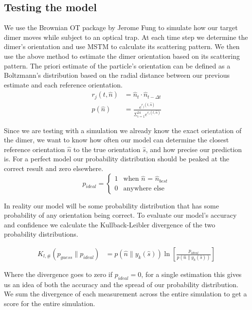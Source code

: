 \documentclass[11pt]{article}
\begin{document}
	\subsection*{Testing the model}
	We use the Brownian OT package by Jerome Fung \cite{Brownian_OT} to simulate how our target dimer moves while subject to an optical trap. At each time step we determine the dimer's orientation and use MSTM to calculate its scattering pattern. We then use the above method to estimate the dimer orientation based on its scattering pattern. The priori estimate of the particle's orientation can be defined as a Boltzmann's distribution based on the radial distance between our previous estimate and each reference orientation. 
	\begin{align}
		r_j(t, \hat{n})&= \hat{n}_{t} \cdot \hat{n}_{t-\Delta t} \\
		p(\hat{n})&= \frac{e^{r_j(t,\hat{n})}}
		{\Sigma_{i=1}^{24}e^{r_i(t, \hat{n})}}
	\end{align}
	
	Since we are testing with a simulation we already know the exact orientation of the dimer, we want to know how often our model can determine the closest reference orientation $\hat{n}$ to the true orientation $\hat{s}$, and how precise our prediction is. For a perfect model our probability distribution should be peaked at the correct result and zero elsewhere.
	\begin{equation}
		p_{ideal}=
		\begin{cases}
			1 & \text{when $\hat{n}$ = $\hat{n}_{best}$}\\
			0 & \text{anywhere else}
		\end{cases}
	\end{equation}

	In reality our model will be some probability distribution that has some probability of any orientation being correct. To evaluate our model's accuracy and confidence we calculate the Kullback-Leibler divergence of the two probability distributions. 
	
	\begin{align}
		K_{l, \#}(p_{guess} \parallel p_{ideal}) &= 
		p(\hat{n}\parallel y_k(\hat{s})) \ln \left[
		\frac{p_{ideal}}{p(\hat{n}\parallel y_k(\hat{s}))}
		\right]
	\end{align}

	Where the divergence goes to zero if $p_{ideal}=0$, for a single estimation this gives us an idea of both the accuracy and the spread of our probability distribution. We sum the divergence of each measurement across the entire simulation to get a score for the entire simulation.
	
\end{document}
